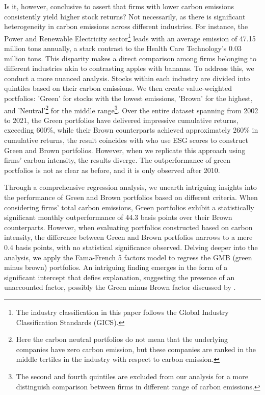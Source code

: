 \documentclass[12pt]{article}
\begin{document}
Is it, however, conclusive to assert that firms with lower carbon emissions consistently yield higher stock returns? Not necessarily, as there is significant heterogeneity in carbon emissions across different industries. For instance, the Power and Renewable Electricity sector\footnote{The industry classification in this paper follows the Global Industry Classification Standards (GICS).} leads with an average emission of 47.15 million tons annually, a stark contrast to the Health Care Technology's 0.03 million tons. This disparity makes a direct comparison among firms belonging to different industries akin to contrasting apples with bananas. To address this, we conduct a more nuanced analysis. Stocks within each industry are divided into quintiles based on their carbon emissions. We then create value-weighted portfolios: 'Green' for stocks with the lowest emissions, 'Brown' for the highest, and 'Neutral'\footnote{Here the carbon neutral portfolios do not mean that the underlying companies have zero carbon emission, but these companies are ranked in the middle tertiles in the industry with respect to carbon emission.} for the middle range\footnote{The second and fourth quintiles are excluded from our analysis for a more distinguish comparison between firms in different range of carbon emissions.}. Over the entire dataset spanning from 2002 to 2021, the Green portfolios have delivered impressive cumulative returns, exceeding 600\%, while their Brown counterparts achieved approximately 260\% in cumulative returns, the result coincides with \cite{pastor2022dissecting} who use ESG scores to construct Green and Brown portfolios. However, when we replicate this approach using firms' carbon intensity, the results diverge. The outperformance of green portfolios is not as clear as before, and it is only observed after 2010.

Through a comprehensive regression analysis, we unearth intriguing insights into the performance of Green and Brown portfolios based on different criteria. When considering firms' total carbon emissions, Green portfolios exhibit a statistically significant monthly outperformance of 44.3 basis points over their Brown counterparts. However, when evaluating portfolios constructed based on carbon intensity, the difference between Green and Brown portfolios narrows to a mere 0.4 basis points, with no statistical significance observed. Delving deeper into the analysis, we apply the Fama-French 5 factors model to regress the GMB (green minus brown) portfolios. An intriguing finding emerges in the form of a significant intercept that defies explanation, suggesting the presence of an unaccounted factor, possibly the Green minus Brown factor discussed by \cite{pastor2022dissecting}. 
\end{document}
